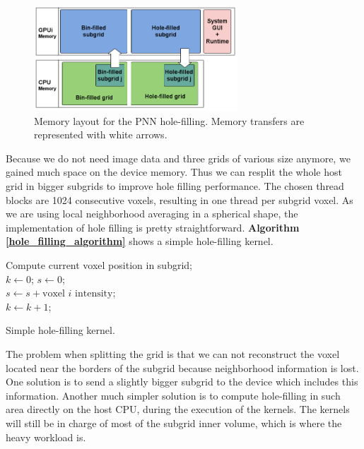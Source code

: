 \documentclass[12pt,journal,compsoc]{IEEEtran}
\begin{document}
\begin{figure}[ht!]
\centering
\includegraphics[width=3.0in]{hole_filling_memory}
\caption{Memory layout for the PNN hole-filling. Memory transfers are represented with white arrows.}
\label{hole_filling_memory}
\end{figure}
 

Because we do not need image data and three grids of various size anymore, we gained much space on the device memory. Thus we can resplit the whole host grid in bigger subgrids to improve hole filling performance. The chosen thread blocks are 1024 consecutive voxels, resulting in one thread per subgrid voxel.
As we are using local neighborhood averaging in a spherical shape, the implementation of hole filling is pretty straightforward. \textbf{Algorithm \ref{hole_filling_algorithm}} shows a simple hole-filling kernel.


\begin{algorithm}
\vspace{0.2cm}
Compute current voxel position in subgrid;\\
$k\gets0$; $s\gets0$;\\
%
{%
{$s\gets s + \text{voxel }i\text{ intensity}$;\\
$k\gets k + 1$;}}

\caption{Simple hole-filling kernel.}
\label{hole_filling_algorithm}
\end{algorithm}

The problem when splitting the grid is that we can not reconstruct the voxel located near the borders of the subgrid because neighborhood information is lost. One solution is to send a slightly bigger subgrid to the device which includes this information. Another much simpler solution is to compute hole-filling in such area directly on the host CPU, during the execution of the kernels. The kernels will still be in charge of most of the subgrid inner volume, which is where the heavy workload is.
\end{document}
